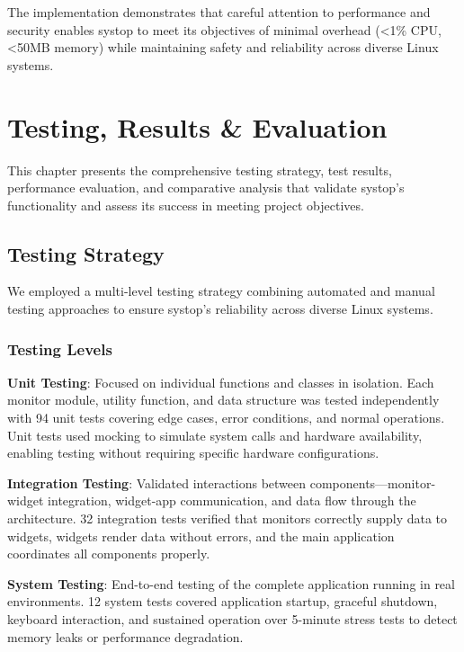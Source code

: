 \documentclass[12pt,a4paper,oneside]{report}
\begin{document}
The implementation demonstrates that careful attention to performance and security enables systop to meet its objectives of minimal overhead (<1\% CPU, <50MB memory) while maintaining safety and reliability across diverse Linux systems.

\chapter{Testing, Results \& Evaluation}
\label{chap:testing}

This chapter presents the comprehensive testing strategy, test results, performance evaluation, and comparative analysis that validate systop's functionality and assess its success in meeting project objectives.

\section{Testing Strategy}
\label{sec:testing-strategy}

We employed a multi-level testing strategy combining automated and manual testing approaches to ensure systop's reliability across diverse Linux systems.

\subsection{Testing Levels}

\textbf{Unit Testing}: Focused on individual functions and classes in isolation. Each monitor module, utility function, and data structure was tested independently with 94 unit tests covering edge cases, error conditions, and normal operations. Unit tests used mocking to simulate system calls and hardware availability, enabling testing without requiring specific hardware configurations.

\textbf{Integration Testing}: Validated interactions between components---monitor-widget integration, widget-app communication, and data flow through the architecture. 32 integration tests verified that monitors correctly supply data to widgets, widgets render data without errors, and the main application coordinates all components properly.

\textbf{System Testing}: End-to-end testing of the complete application running in real environments. 12 system tests covered application startup, graceful shutdown, keyboard interaction, and sustained operation over 5-minute stress tests to detect memory leaks or performance degradation.
\end{document}

